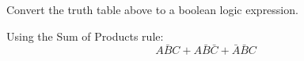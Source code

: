 \begin{blocksection}
\question

Convert the truth table above to a boolean logic expression.

\begin{solution}[0.2in]
Using the Sum of Products rule:
$$A\bar{B}C + A\bar{B}\bar{C} + \bar{A}\bar{B}C$$
\end{solution}

\end{blocksection}